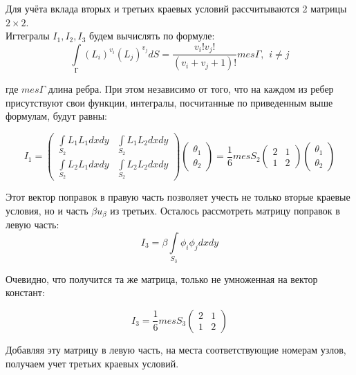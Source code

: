 \documentclass[12pt,a4paper]{article}
\begin{document}
\noindent Для учёта вклада вторых и третьих краевых условий
рассчитываются 2 матрицы $2 \times 2$. \\

\noindent Игтегралы $I_1, I_2, I_3$ будем вычислять по формуле:
$$
    \int \limits_Г (L_i)^{v_i} (L_j)^{v_j} dS =
    \frac{v_i ! v_j !}{(v_i + v_j + 1)!} mes \varGamma,
    \hspace{5pt} i \neq j
$$

\noindent где $mes \varGamma$ длина ребра. При этом независимо
от того, что на каждом из ребер присутствуют свои функции,
интегралы, посчитанные по приведенным выше формулам,
будут равны:

\renewcommand{\arraystretch}{1.25}
\begin{equation*}
    I_1 =
    \begin{pmatrix}
        \int \limits_{S_2} L_1L_1dxdy & \int \limits_{S_2} L_1L_2dxdy \\
        \int \limits_{S_2} L_2L_1dxdy & \int \limits_{S_2} L_2L_2dxdy
    \end{pmatrix}
    \begin{pmatrix}
        \theta_1 \\
        \theta_2
    \end{pmatrix}
    = \frac{1}{6} mes S_2
    \begin{pmatrix}
        2 & 1 \\
        1 & 2
    \end{pmatrix}
    \begin{pmatrix}
        \theta_1 \\
        \theta_2
    \end{pmatrix}
\end{equation*}
\renewcommand{\arraystretch}{1.0}

\noindent Этот вектор поправок в правую
часть позволяет учесть не только вторые
краевые условия, но и часть
$\beta u_{\beta}$ из третьих.
Осталось рассмотреть матрицу
поправок в левую часть:
$$
I_3 = \beta \int \limits_{S_3}
\phi_i \phi_j dxdy
$$

\noindent Очевидно, что получится та же
матрица, только не умноженная на вектор
констант:

$$
I_3 = \frac{1}{6} mes S_3
\begin{pmatrix}
    2 & 1 \\
    1 & 2
\end{pmatrix}
$$

\noindent Добавляя эту матрицу в левую часть,
на места соответствующие номерам узлов,
получаем учет третьих краевых условий.
\end{document}
